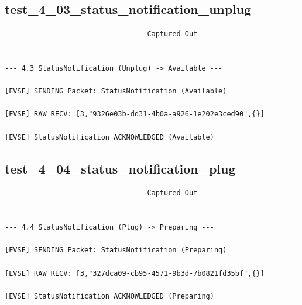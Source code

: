 \documentclass{article}
\begin{document}
\subsection*{test\_4\_03\_status\_notification\_unplug}
\begin{lstlisting}
--------------------------------- Captured Out ---------------------------------

--- 4.3 StatusNotification (Unplug) -> Available ---

[EVSE] SENDING Packet: StatusNotification (Available)

[EVSE] RAW RECV: [3,"9326e03b-dd31-4b0a-a926-1e202e3ced90",{}]

[EVSE] StatusNotification ACKNOWLEDGED (Available)
\end{lstlisting}
\subsection*{test\_4\_04\_status\_notification\_plug}
\begin{lstlisting}
--------------------------------- Captured Out ---------------------------------

--- 4.4 StatusNotification (Plug) -> Preparing ---

[EVSE] SENDING Packet: StatusNotification (Preparing)

[EVSE] RAW RECV: [3,"327dca09-cb95-4571-9b3d-7b0821fd35bf",{}]

[EVSE] StatusNotification ACKNOWLEDGED (Preparing)
\end{lstlisting}
\end{document}
